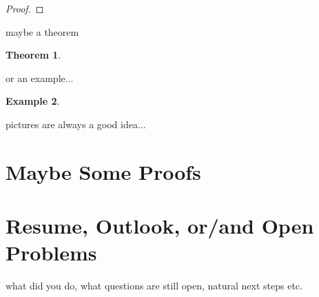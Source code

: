 \documentclass[12pt]{amsart}
\numberwithin{equation}{section}
\newtheorem{thm}{Theorem}
\theoremstyle{definition}
\newtheorem{example}[thm]{Example}
\numberwithin{thm}{section}
\begin{document}
\begin{proof}

\end{proof}

maybe a theorem


\begin{thm}

\end{thm}

or an example...
\begin{example}

\end{example}

pictures are always a good idea...



\section{Maybe Some Proofs}


\section{Resume, Outlook, or/and Open Problems}
\label{Sec:Outlook}


what did you do, what questions are still open, natural next steps etc. 





\end{document}
